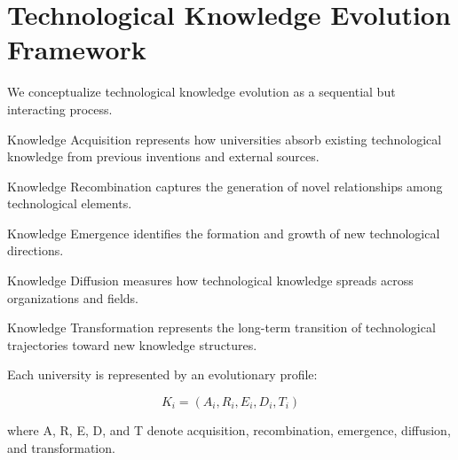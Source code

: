 
\section{Technological Knowledge Evolution Framework}

We conceptualize technological knowledge evolution as a sequential but interacting process.

Knowledge Acquisition represents how universities absorb existing technological knowledge from previous inventions and external sources.

Knowledge Recombination captures the generation of novel relationships among technological elements.

Knowledge Emergence identifies the formation and growth of new technological directions.

Knowledge Diffusion measures how technological knowledge spreads across organizations and fields.

Knowledge Transformation represents the long-term transition of technological trajectories toward new knowledge structures.

Each university is represented by an evolutionary profile:

\[
K_i=(A_i,R_i,E_i,D_i,T_i)
\]

where A, R, E, D, and T denote acquisition, recombination, emergence, diffusion, and transformation.
